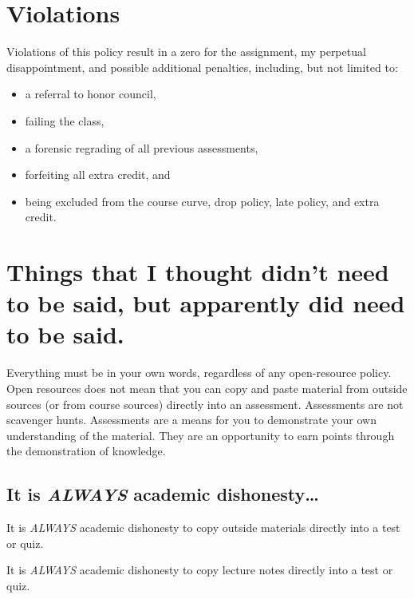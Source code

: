 \documentclass[
]{book}
\providecommand{\tightlist}{%
  \setlength{\itemsep}{0pt}\setlength{\parskip}{0pt}}
\begin{document}
\hypertarget{violations}{%
\section{Violations}\label{violations}}

Violations of this policy result in a zero for the assignment, my perpetual disappointment, and possible additional penalties, including, but not limited to:

\begin{itemize}
\tightlist
\item
  a referral to honor council,
\item
  failing the class,
\item
  a forensic regrading of all previous assessments,
\item
  forfeiting all extra credit, and
\item
  being excluded from the course curve, drop policy, late policy, and extra credit.
\end{itemize}

\hypertarget{things-that-i-thought-didnt-need-to-be-said-but-apparently-did-need-to-be-said.}{%
\section{Things that I thought didn't need to be said, but apparently did need to be said.}\label{things-that-i-thought-didnt-need-to-be-said-but-apparently-did-need-to-be-said.}}

Everything must be in your own words, regardless of any open-resource policy.
Open resources does not mean that you can copy and paste material from outside sources (or from course sources) directly into an assessment.
Assessments are not scavenger hunts.
Assessments are a means for you to demonstrate your own understanding of the material.
They are an opportunity to earn points through the demonstration of knowledge.

\hypertarget{it-is-always-academic-dishonesty}{%
\subsection{\texorpdfstring{It is \emph{ALWAYS} academic dishonesty\ldots{}}{It is ALWAYS academic dishonesty\ldots{}}}\label{it-is-always-academic-dishonesty}}

It is \emph{ALWAYS} academic dishonesty to copy outside materials directly into a test or quiz.

It is \emph{ALWAYS} academic dishonesty to copy lecture notes directly into a test or quiz.
\end{document}
